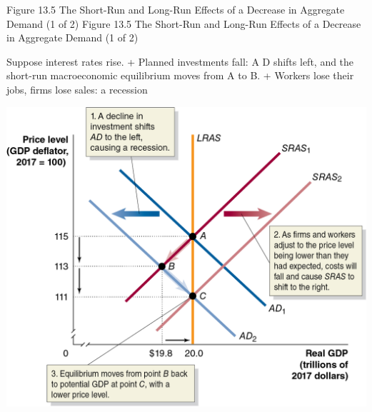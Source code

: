 \documentclass[
  12pt,
  ignorenonframetext,
]{beamer}
\begin{document}
\begin{frame}{Figure 13.5 The Short-Run and Long-Run Effects of a
Decrease in Aggregate Demand (1 of 2)}
\protect\hypertarget{figure-13.5-the-short-run-and-long-run-effects-of-a-decrease-in-aggregate-demand-1-of-2}{}
Figure 13.5 The Short-Run and Long-Run Effects of a Decrease in
Aggregate Demand (1 of 2)

Suppose interest rates rise. + Planned investments fall: A D shifts
left, and the short-run macroeconomic equilibrium moves from A to B. +
Workers lose their jobs, firms lose sales: a recession

\includegraphics[width=\textwidth,height=0.99\textheight]{imgs3/img_slide32a.png}
\end{frame}
\end{document}
